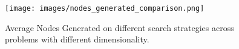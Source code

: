 \documentclass{article}
\begin{document}
\begin{center}
		      \begin{figure}[!ht]
			      \centering
			      \texttt{[image: images/nodes\_generated\_comparison.png]}
			      \caption{Average Nodes Generated on different search strategies across problems with different dimensionality.}
			      \label{fig:complexity-graph-comparison}
		      \end{figure}
	      \end{center}
\end{document}
